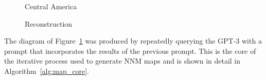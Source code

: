\documentclass[11pt,dvipdfm]{article}
\begin{document}
\begin{figure}[!htbp]
	\centering
	\begin{minipage}{0.45\textwidth}
		\centering
		\caption{\label{fig:central_america}Central America}
	\end{minipage}%
	\begin{minipage}{0.45\textwidth}
		\centering
		\caption{\label{fig:gpt3_central_america}Reconstruction}
	\end{minipage}%
\end{figure}

The diagram of Figure~\ref{fig:gpt3_central_america} was produced by repeatedly querying the GPT-3 with a prompt that incorporates the results of the previous prompt. This is the core of the iterative process used to generate NNM maps and is shown in detail in Algorithm~\ref{alg:map_core}. 
\end{document}
